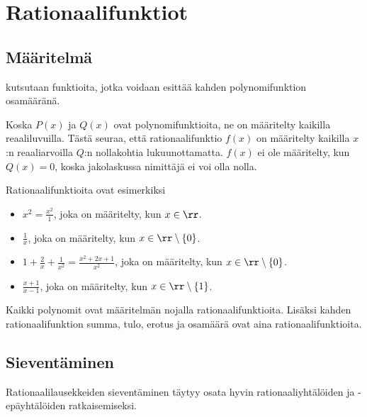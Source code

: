 \chapter{Rationaalifunktiot}

\section{Määritelmä}

 kutsutaan funktioita, jotka voidaan esittää kahden
polynomifunktion osamääränä.


Koska $P(x)$ ja $Q(x)$ ovat polynomifunktioita, ne on määritelty kaikilla reaaliluvuilla. Tästä seuraa, että
rationaalifunktio $f(x)$ on määritelty kaikilla $x$:n reaaliarvoilla $Q$:n nollakohtia lukuunottamatta. $f(x)$ ei
ole määritelty, kun $Q(x)=0$, koska jakolaskussa nimittäjä ei voi olla nolla.

\begin{esimerkki}
	Rationaalifunktioita ovat esimerkiksi
	\begin{itemize}
		\item{$x^2 = \frac{x^2}{1}$, joka on määritelty, kun $x\in\rr$.}
		\item{$\frac1x$, joka on määritelty, kun $x\in\rr\setminus\left\{0\right\}$.}
		\item{$1+\frac2x+\frac1{x^2} = \frac{x^2+2x+1}{x^2}$, joka on määritelty, kun $x\in\rr\setminus\left\{0\right\}$.}
		\item{$\frac{x+1}{x-1}$, joka on määritelty, kun $x\in\rr\setminus\left\{1\right\}$.}
	\end{itemize}
\end{esimerkki}

Kaikki polynomit ovat määritelmän nojalla rationaalifunktioita. Lisäksi kahden rationaalifunktion summa, tulo, erotus ja osamäärä ovat aina rationaalifunktioita.

\section{Sieventäminen}

Rationaalilausekkeiden sieventäminen täytyy osata hyvin rationaaliyhtälöiden ja -epäyhtälöiden
ratkaisemiseksi.

